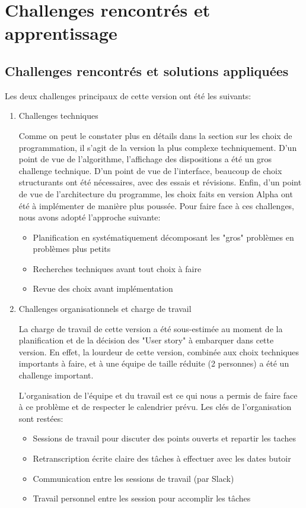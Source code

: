 \section{Challenges rencontrés et apprentissage}

\subsection{Challenges rencontrés et solutions appliquées}

Les deux challenges principaux de cette version ont été les suivants:
\begin{enumerate}
    \item Challenges techniques

          Comme on peut le constater plus en détails dans la section sur les choix de programmation, il s’agit de la version la plus complexe techniquement.
          D’un point de vue de l’algorithme, l’affichage des dispositions a été un gros challenge technique.
          D’un point de vue de l’interface, beaucoup de choix structurants ont été nécessaires, avec des essais et révisions.
          Enfin, d’un point de vue de l’architecture du programme, les choix faits en version Alpha ont été à implémenter de manière plus poussée.
          Pour faire face à ces challenges, nous avons adopté l’approche suivante:
          \begin{itemize}
              \item Planification en systématiquement décomposant les "gros" problèmes en problèmes plus petits
              \item Recherches techniques avant tout choix à faire
              \item Revue des choix avant implémentation
          \end{itemize}
    \item Challenges organisationnels et charge de travail

          La charge de travail de cette version a été sous-estimée au moment de la planification et de la décision des "User story" à embarquer
          dans cette version. En effet, la lourdeur de cette version, combinée aux choix techniques importants à faire, et à une équipe
          de taille réduite (2 personnes) a été un challenge important.

          L’organisation de l'équipe et du travail est ce qui nous a permis de faire face à ce problème et de respecter le calendrier prévu.
          Les clés de l’organisation sont restées:
          \begin{itemize}
              \item Sessions de travail pour discuter des points ouverts et repartir les taches
              \item Retranscription écrite claire des tâches à effectuer avec les dates butoir
              \item Communication entre les sessions de travail (par Slack)
              \item Travail personnel entre les session pour accomplir les tâches
          \end{itemize}

\end{enumerate}


